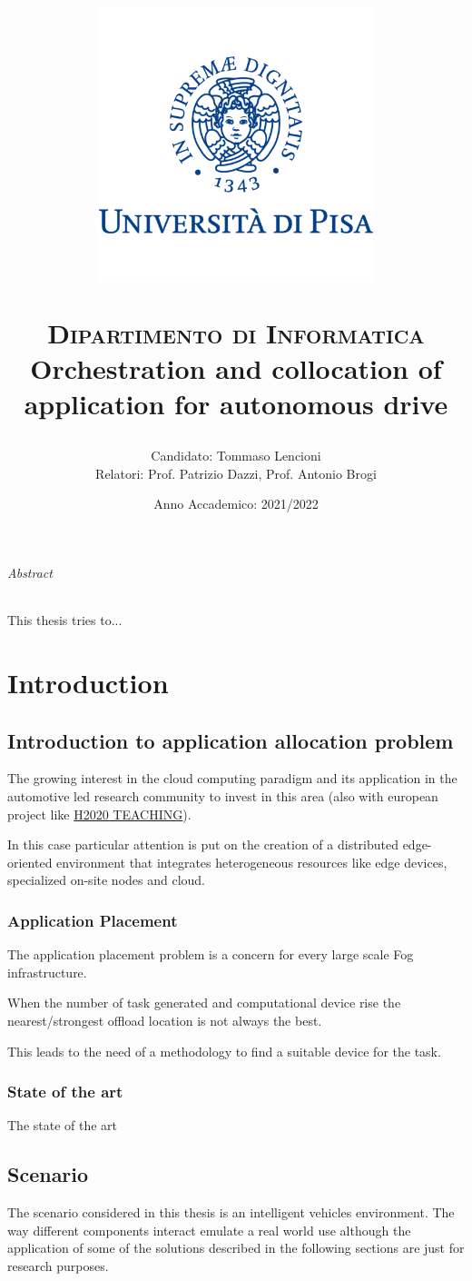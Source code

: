 \documentclass[12pt]{report}
\title{\centerline{\includegraphics[width=8cm,height=8cm]{logo.png}}
{\scshape Dipartimento di Informatica}\\
\vspace{0.5cm}
Orchestration and collocation of application for autonomous drive}
\author{Candidato: Tommaso Lencioni\\
Relatori: Prof. Patrizio Dazzi, Prof. Antonio Brogi}
\date{Anno Accademico: 2021/2022}
\begin{document}
\maketitle


\tableofcontents{}

\pagebreak

\paragraph*{Abstract}
This thesis tries to...


\part*{Introduction}
\chapter{Introduction to application allocation problem}
The growing interest in the cloud computing paradigm and its application in the automotive led research community to invest in this area (also with european project like \href{https://www.teaching-h2020.eu}{H2020 TEACHING}).

In this case particular attention is put on the creation of a distributed edge-oriented environment that integrates heterogeneous resources like edge devices, specialized on-site nodes and cloud.

\section{Application Placement}
The application placement problem is a concern for every large scale Fog infrastructure.

When the number of task generated and computational device rise the nearest/strongest offload location is not always the best.

This leads to the need of a methodology to find a suitable device for the task.


\section{State of the art}
The state of the art

\chapter{Scenario}
The scenario considered in this thesis is an intelligent vehicles environment. The way different components interact emulate a real world use although the application of some of the solutions described in the following sections are just for research purposes.
\end{document}
